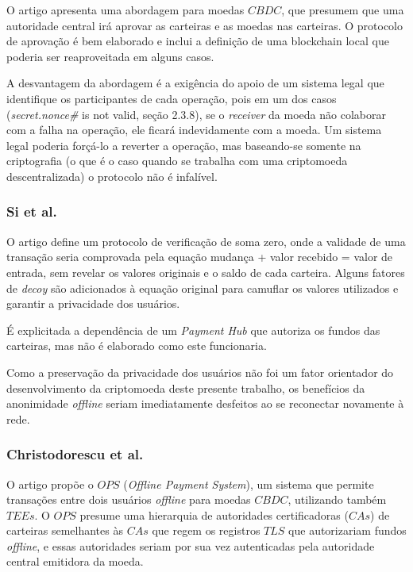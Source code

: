 \documentclass[
  12pt,
  a4paper,
  oneside,
  article,
]{abntex2}
\begin{document}
O artigo apresenta uma abordagem para moedas $CBDC$, que presumem que uma autoridade central irá aprovar as carteiras e as moedas nas carteiras. O protocolo de aprovação é bem elaborado e inclui a definição de uma blockchain local que poderia ser reaproveitada em alguns casos.

A desvantagem da abordagem é a exigência do apoio de um sistema legal que identifique os participantes de cada operação, pois em um dos casos (\textit{secret.nonce\#} is not valid, seção 2.3.8), se o \textit{receiver} da moeda não colaborar com a falha na operação, ele ficará indevidamente com a moeda. Um sistema legal poderia forçá-lo a reverter a operação, mas baseando-se somente na criptografia (o que é o caso quando se trabalha com uma criptomoeda descentralizada) o protocolo não é infalível.

\subsubsection{Si et al.}

O artigo define um protocolo de verificação de soma zero, onde a validade de uma transação seria comprovada pela equação mudança + valor recebido = valor de entrada, sem revelar os valores originais e o saldo de cada carteira. Alguns fatores de \textit{decoy} são adicionados à equação original para camuflar os valores utilizados e garantir a privacidade dos usuários.

É explicitada a dependência de um \textit{Payment Hub} que autoriza os fundos das carteiras, mas não é elaborado como este funcionaria.

Como a preservação da privacidade dos usuários não foi um fator orientador do desenvolvimento da criptomoeda deste presente trabalho, os benefícios da anonimidade \textit{offline} seriam imediatamente desfeitos ao se reconectar novamente à rede.

\subsubsection{Christodorescu et al.}

O artigo propõe o $OPS$ (\textit{Offline Payment System}), um sistema que permite transações entre dois usuários \textit{offline} para moedas $CBDC$, utilizando também $TEEs$. O $OPS$ presume uma hierarquia de autoridades certificadoras ($CAs$) de carteiras semelhantes às $CAs$ que regem os registros $TLS$ que autorizariam fundos \textit{offline}, e essas autoridades seriam por sua vez autenticadas pela autoridade central emitidora da moeda.
\end{document}
